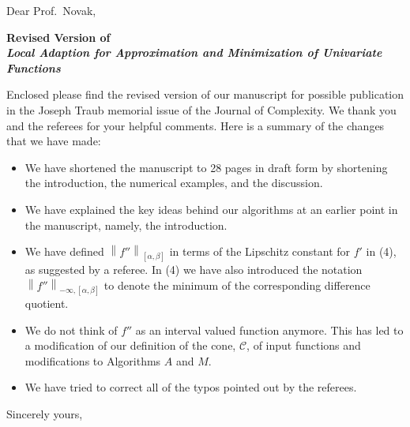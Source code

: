 \documentclass[11pt]{iitletter}
\date{\today}  %
\newcommand{\norm}[2][{}]{\ensuremath{\left \lVert #2 \right \rVert}_{#1}}
\renewcommand{\cc}{\mathcal{C}}
\begin{document}
\begin{letter}{}

\opening{Dear Prof.\ Novak,}

\begin{center} \textbf{ Revised Version of \\
		\emph{Local Adaption for Approximation and 
Minimization of Univariate Functions}} \end{center}
Enclosed please find the revised version of our manuscript for possible publication in the 
Joseph Traub memorial issue of the Journal of Complexity.  We thank you  and the 
referees for your helpful comments.  Here is a summary of the changes that we have 
made:

\begin{itemize}
	\item We have shortened the manuscript to 28 pages in draft form by shortening the 
	introduction, the numerical examples, and the discussion.
	
	\item We have explained the key ideas behind our algorithms at an earlier point in the 
	manuscript, namely, the introduction.
	
	\item We have defined $\norm[{[\alpha,\beta]}]{f''}$ in terms of the Lipschitz constant 
	for $f'$ in (4), as suggested by a referee.  In (4) we have also introduced the notation 
	$\norm[-\infty,{[\alpha,\beta]}]{f''}$ to denote the minimum of the corresponding 
	difference quotient.  
	
	\item We do not think of $f''$ as an interval valued function anymore.  This has led to a 
	modification of our definition of the cone, $\cc$, of input functions and modifications 
	to Algorithms $A$ and $M$.
	
	\item We have tried to correct all of the typos pointed out by the referees.


\end{itemize}


\closing{Sincerely yours,}


%
%
%

\end{letter}
\end{document}
